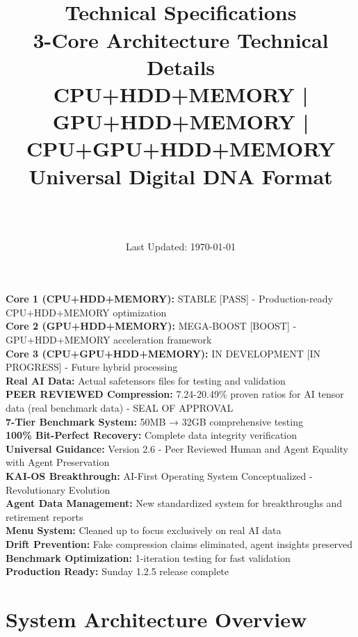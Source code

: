 \documentclass[12pt,a4paper]{article}
\title{\Huge\textbf{\project\ \version}\\[0.5cm]
\Large\textbf{Technical Specifications}\\[0.3cm]
\large 3-Core Architecture Technical Details\\[0.5cm]
\large CPU+HDD+MEMORY | GPU+HDD+MEMORY | CPU+GPU+HDD+MEMORY\\[0.3cm]
\large Universal Digital DNA Format}
\author{\Large\authorname\\[0.2cm]\email\\[0.2cm]\github}
\date{\large Last Updated: \today}
\begin{document}
\maketitle
\thispagestyle{empty}

\begin{tcolorbox}[colback=blue!10,colframe=blue!50,title=\textbf{V2.3 - 3-Core System - ENHANCED STANDARD TECHNICAL SPECIFICATIONS}]
\textbf{Core 1 (CPU+HDD+MEMORY):} STABLE [PASS] - Production-ready CPU+HDD+MEMORY optimization\\
\textbf{Core 2 (GPU+HDD+MEMORY):} MEGA-BOOST [BOOST] - GPU+HDD+MEMORY acceleration framework\\
\textbf{Core 3 (CPU+GPU+HDD+MEMORY):} IN DEVELOPMENT [IN PROGRESS] - Future hybrid processing\\
\textbf{Real AI Data:} Actual safetensors files for testing and validation\\
\textbf{PEER REVIEWED Compression:} 7.24-20.49\% proven ratios for AI tensor data (real benchmark data) - \checkmark SEAL OF APPROVAL\\
\textbf{7-Tier Benchmark System:} 50MB → 32GB comprehensive testing\\
\textbf{100\% Bit-Perfect Recovery:} Complete data integrity verification\\
\textbf{Universal Guidance:} Version 2.6 - Peer Reviewed Human and Agent Equality with Agent Preservation\\
\textbf{KAI-OS Breakthrough:} AI-First Operating System Conceptualized - Revolutionary Evolution\\
\textbf{Agent Data Management:} New standardized system for breakthroughs and retirement reports\\
\textbf{Menu System:} Cleaned up to focus exclusively on real AI data\\
\textbf{Drift Prevention:} Fake compression claims eliminated, agent insights preserved\\
\textbf{Benchmark Optimization:} 1-iteration testing for fast validation\\
\textbf{Production Ready:} Sunday 1.2.5 release complete
\end{tcolorbox}

\tableofcontents
\newpage

\section{System Architecture Overview}
\end{document}
